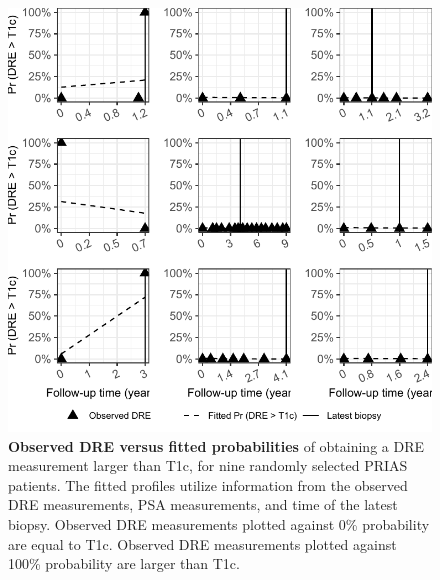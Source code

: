 \begin{subappendices}
\begin{figure}
\includegraphics{contents/c3/images/c3_fig_app3.pdf}
\caption{\textbf{Observed DRE versus fitted probabilities} of obtaining a DRE measurement larger than T1c, for nine randomly selected PRIAS patients. The fitted profiles utilize information from the observed DRE measurements, PSA measurements, and time of the latest biopsy. Observed DRE measurements plotted against 0\% probability are equal to T1c. Observed DRE measurements plotted against 100\% probability are larger than T1c.}
\label{c3:fig:app3}
\end{figure}


\end{subappendices}
